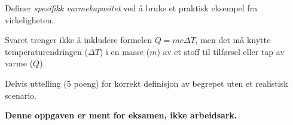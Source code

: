 

Definer {\it spesifikk varmekapasitet} ved å bruke et praktisk eksempel fra virkeligheten.

\vskip 50pt







Svaret trenger ikke å inkludere formelen $Q = mc \Delta T$, men det må knytte temperaturendringen ($\Delta T$) i en masse ($m$) av et stoff til tilførsel eller tap av varme ($Q$).

\vskip 10pt

Delvis uttelling (5 poeng) for korrekt definisjon av begrepet uten et realistisk scenario.







{\bf Denne oppgaven er ment for eksamen, ikke arbeidsark.}



